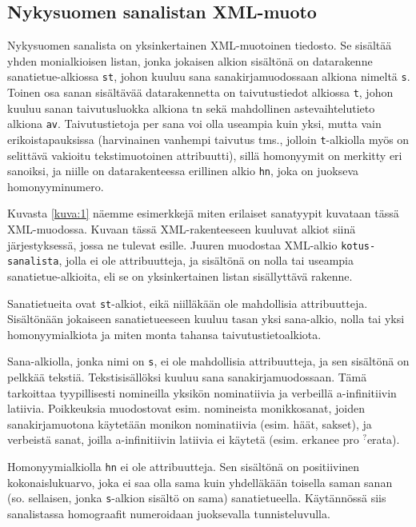 \documentclass[free]{flammie}
\begin{document}
\subsection{Nykysuomen sanalistan XML-muoto} \label{subsec:21}

Nykysuomen sanalista on yksinkertainen XML-muotoinen tiedosto. Se sisältää yhden
monialkioisen listan, jonka jokaisen alkion sisältönä on datarakenne
sanatietue-alkiossa \texttt{st}, johon kuuluu sana sanakirjamuodossaan alkiona
nimeltä \texttt{s}.
Toinen osa sanan sisältävää datarakennetta on taivutustiedot alkiossa \texttt{t}, johon
kuuluu sanan taivutusluokka alkiona tn sekä mahdollinen astevaihtelutieto
alkiona \texttt{av}. Taivutustietoja per sana voi olla useampia kuin yksi, mutta vain
erikoistapauksissa (harvinainen vanhempi taivutus tms., jolloin \texttt{t}-alkiolla myös
on selittävä vakioitu tekstimuotoinen attribuutti), sillä homonyymit on merkitty
eri sanoiksi, ja niille on datarakenteessa erillinen alkio \texttt{hn}, joka on juokseva
homonyyminumero.

Kuvasta \ref{kuva:1} näemme esimerkkejä miten erilaiset sanatyypit
kuvataan tässä XML-muodossa. Kuvaan tässä XML-rakenteeseen kuuluvat alkiot siinä
järjestyksessä, jossa ne tulevat esille. Juuren muodostaa XML-alkio
\texttt{kotus-sanalista}, jolla
ei ole attribuutteja, ja sisältönä on nolla tai useampia sanatietue-alkioita, eli se on
yksinkertainen listan sisällyttävä rakenne.

Sanatietueita ovat \texttt{st}-alkiot, eikä niilläkään ole mahdollisia attribuutteja. Sisältönään jokaiseen sanatietueeseen kuuluu tasan yksi sana-alkio, nolla tai yksi homonyymialkiota ja miten monta tahansa taivutustietoalkiota.

Sana-alkiolla, jonka nimi on \texttt{s}, ei ole mahdollisia attribuutteja, ja sen sisältönä on
pelkkää tekstiä. Tekstisisällöksi kuuluu sana sanakirjamuodossaan. Tämä tarkoittaa tyypillisesti nomineilla yksikön nominatiivia ja verbeillä a-infinitiivin latiivia.
Poikkeuksia muodostovat esim. nomineista monikkosanat, joiden sanakirjamuotona käytetään monikon nominatiivia (esim. häät, sakset), ja verbeistä sanat, joilla
a-infinitiivin latiivia ei käytetä (esim. erkanee pro $^?$erata).

Homonyymialkiolla \texttt{hn} ei ole attribuutteja. Sen sisältönä on positiivinen kokonaislukuarvo, joka ei saa olla sama kuin yhdelläkään toisella saman sanan (so.
sellaisen, jonka \texttt{s}-alkion sisältö on sama) sanatietueella. Käytännössä siis sanalistassa homograafit numeroidaan juoksevalla tunnisteluvulla.
\end{document}
